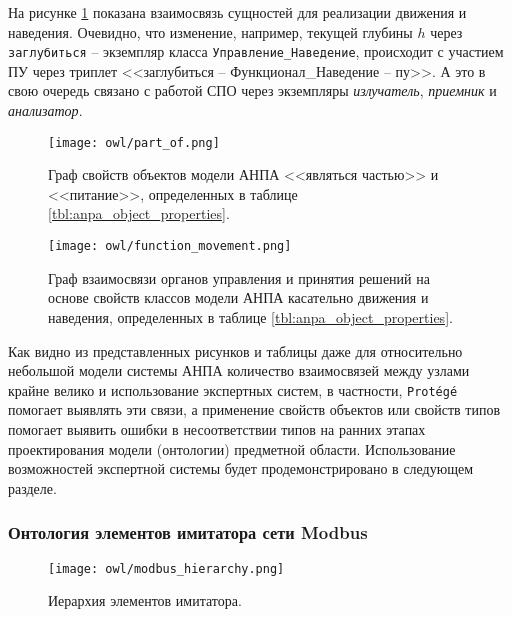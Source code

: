 На рисунке \ref{fig:function_movement} показана взаимосвязь сущностей для реализации движения и наведения.
Очевидно, что изменение, например, текущей глубины $h$ через \texttt{заглубиться} -- экземпляр класса \texttt{Управление\_Наведение},
происходит с участием ПУ через триплет <<заглубиться -- Функционал\_Наведение -- пу>>.
А это в свою очередь связано с работой СПО через экземпляры \textit{излучатель}, \textit{приемник} и \textit{анализатор}.

\begin{center}
    \begin{figure}[hb!]
        \texttt{[image: owl/part\_of.png]}
        \caption{Граф свойств объектов модели АНПА <<являться частью>> и  <<питание>>, определенных в таблице \ref{tbl:anpa_object_properties}.}\label{fig:part_of}
        \texttt{[image: owl/function\_movement.png]}
        \caption{Граф взаимосвязи органов управления и принятия решений на основе свойств классов модели АНПА касательно движения и наведения,
            определенных в таблице \ref{tbl:anpa_object_properties}.}\label{fig:function_movement}
    \end{figure}
\end{center}

Как видно из представленных рисунков и таблицы даже для относительно небольшой модели системы АНПА количество взаимосвязей между узлами
крайне велико и использование экспертных систем, в частности, \texttt{Protégé} помогает выявлять эти связи,
а применение свойств объектов или свойств типов помогает выявить ошибки в несоответствии типов на ранних этапах проектирования модели (онтологии)
предметной области. Использование возможностей экспертной системы будет продемонстрировано в следующем разделе.


\subsubsection{Онтология элементов имитатора сети Modbus}

\begin{center}
    \begin{figure}[hb!]
        \texttt{[image: owl/modbus\_hierarchy.png]}
        \caption{Иерархия элементов имитатора.}\label{fig:modbus_hierarchy}
    \end{figure}
\end{center}


